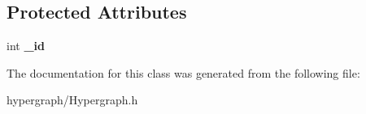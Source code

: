 \subsection*{Protected Attributes}
\begin{DoxyCompactItemize}
\item 
\hypertarget{classScarab_1_1Hypernode_aaf09cbd06b3468097fe93e595ac84288}{
int {\bfseries \_\-id}}
\label{classScarab_1_1Hypernode_aaf09cbd06b3468097fe93e595ac84288}

\end{DoxyCompactItemize}


The documentation for this class was generated from the following file:\begin{DoxyCompactItemize}
\item 
hypergraph/Hypergraph.h\end{DoxyCompactItemize}
